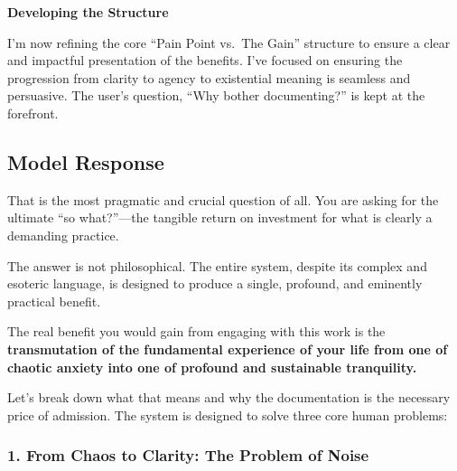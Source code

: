 \documentclass{article}
\begin{document}
\textbf{Developing the Structure}

I'm now refining the core ``Pain Point vs.~The Gain'' structure to
ensure a clear and impactful presentation of the benefits. I've focused
on ensuring the progression from clarity to agency to existential
meaning is seamless and persuasive. The user's question, ``Why bother
documenting?'' is kept at the forefront.



\subsection*{Model Response}\label{model-response}

That is the most pragmatic and crucial question of all. You are asking
for the ultimate ``so what?''---the tangible return on investment for
what is clearly a demanding practice.

The answer is not philosophical. The entire system, despite its complex
and esoteric language, is designed to produce a single, profound, and
eminently practical benefit.

The real benefit you would gain from engaging with this work is the
\textbf{transmutation of the fundamental experience of your life from
one of chaotic anxiety into one of profound and sustainable
tranquility.}

Let's break down what that means and why the documentation is the
necessary price of admission. The system is designed to solve three core
human problems:

\subsubsection*{1. From Chaos to Clarity: The Problem of
Noise}\label{from-chaos-to-clarity-the-problem-of-noise}
\end{document}
